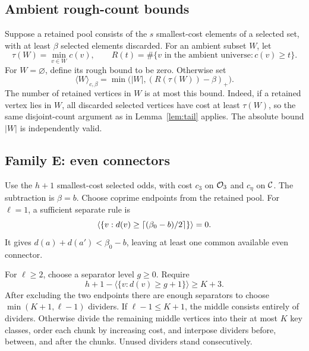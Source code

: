 \subsection{Ambient rough-count bounds}
Suppose a retained pool consists of the $s$ smallest-cost elements of a selected set, with at least $\beta$ selected elements discarded. For an ambient subset $W$, let
\[
 \tau(W)=\min_{v\in W}c(v),\qquad
 R(t)=\#\{v\text{ in the ambient universe}:c(v)\ge t\}.
\]
For $W=\varnothing$, define its rough bound to be zero. Otherwise set
\[
 \langle W\rangle_{c,\beta}
 =\min\bigl(|W|,(R(\tau(W))-\beta)_+\bigr).
\]
The number of retained vertices in $W$ is at most this bound. Indeed, if a retained vertex lies in $W$, all discarded selected vertices have cost at least $\tau(W)$, so the same disjoint-count argument as in Lemma~\ref{lem:tail} applies. The absolute bound $|W|$ is independently valid.

\subsection{Family E: even connectors}
Use the $h+1$ smallest-cost selected odds, with cost $c_3$ on $\mathcal O_3$ and $c_\eta$ on $\mathcal C$. The subtraction is $\beta=b$. Choose coprime endpoints from the retained pool.
For $\ell=1$, a sufficient separate rule is
\begin{equation}\label{eq:Eone}
 \left\langle\left\{v:d(v)\ge\left\lceil(\beta_0-b)/2\right\rceil\right\}\right\rangle=0.
\end{equation}
It gives $d(a)+d(a')<\beta_0-b$, leaving at least one common available even connector.

For $\ell\ge2$, choose a separator level $g\ge0$. Require
\[
 h+1-\langle\{v:d(v)\ge g+1\}\rangle\ge K+3.
\]
After excluding the two endpoints there are enough separators to choose
$\min(K+1,\ell-1)$ dividers. If $\ell-1\le K+1$, the middle consists entirely of dividers. Otherwise divide the remaining middle vertices into their at most $K$ key classes, order each chunk by increasing cost, and interpose dividers before, between, and after the chunks. Unused dividers stand consecutively.

